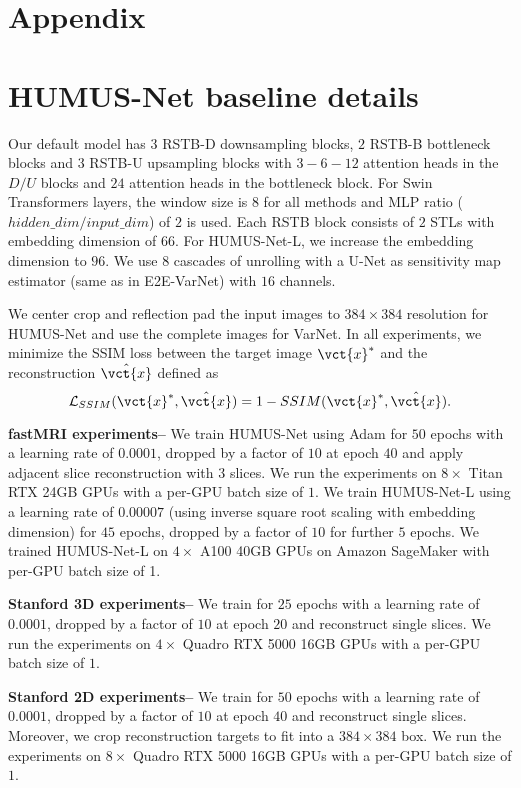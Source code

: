 \section*{Appendix}
\section{HUMUS-Net baseline details \label{sec:apx_bl}}
Our default model has $3$ RSTB-D downsampling blocks, $2$ RSTB-B bottleneck blocks and $3$ RSTB-U upsampling blocks with $3-6-12$ attention heads in the $D/U$ blocks and $24$ attention heads in the bottleneck block. For Swin Transformers layers, the window size is $8$ for all methods and MLP ratio ($hidden\_dim / input\_dim$) of $2$ is used. Each RSTB block consists of  $2$ STLs with embedding dimension of $66$. For HUMUS-Net-L, we increase the embedding dimension to $96$. We use $8$ cascades of unrolling with a U-Net as sensitivity map estimator (same as in E2E-VarNet) with $16$ channels.

We center crop and  reflection pad the input images to $384 \times 384$ resolution for HUMUS-Net and use the complete images for VarNet. In all experiments, we minimize the SSIM loss between the target image $\vct{x}^*$ and the reconstruction $\hat{\vct{x}}$ defined as
$$ \mathcal{L}_{SSIM}(\vct{x}^*, \hat{\vct{x}}) = 1 - SSIM(\vct{x}^*, \hat{\vct{x}}).$$ 

\textbf{fastMRI experiments--} We train HUMUS-Net using Adam for $50$ epochs with a learning rate of $0.0001$, dropped by a factor of $10$ at epoch $40$ and apply adjacent slice reconstruction with $3$ slices. We run the experiments on $8\times$ Titan RTX 24GB GPUs with a per-GPU batch size of $1$. We train HUMUS-Net-L using a learning rate of $0.00007$ (using inverse square root scaling with embedding dimension) for $45$ epochs, dropped by a factor of $10$ for further $5$ epochs. We trained HUMUS-Net-L on $4\times$ A100 40GB GPUs on Amazon SageMaker with per-GPU batch size of 1.

\textbf{Stanford 3D experiments--} We train for $25$ epochs with a learning rate of $0.0001$, dropped by a factor of $10$ at epoch $20$ and reconstruct single slices. We run the experiments on $4\times$ Quadro RTX 5000 16GB GPUs with a per-GPU batch size of $1$. 

\textbf{Stanford 2D experiments--} We train for $50$ epochs with a learning rate of $0.0001$, dropped by a factor of $10$ at epoch $40$ and reconstruct single slices. Moreover, we crop reconstruction targets to fit into a $384 \times 384$ box. We run the experiments on $8\times$ Quadro RTX 5000 16GB GPUs with a per-GPU batch size of $1$. 


